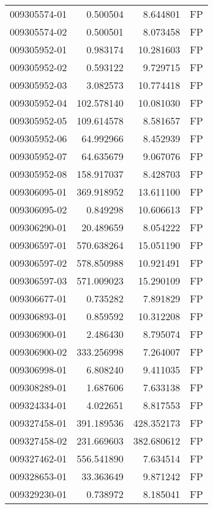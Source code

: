 \begin{tabular}{lrrl}
009305574-01 &    0.500504 &       8.644801 &   FP \\
009305574-02 &    0.500501 &       8.073458 &   FP \\
009305952-01 &    0.983174 &      10.281603 &   FP \\
009305952-02 &    0.593122 &       9.729715 &   FP \\
009305952-03 &    3.082573 &      10.774418 &   FP \\
009305952-04 &  102.578140 &      10.081030 &   FP \\
009305952-05 &  109.614578 &       8.581657 &   FP \\
009305952-06 &   64.992966 &       8.452939 &   FP \\
009305952-07 &   64.635679 &       9.067076 &   FP \\
009305952-08 &  158.917037 &       8.428703 &   FP \\
009306095-01 &  369.918952 &      13.611100 &   FP \\
009306095-02 &    0.849298 &      10.606613 &   FP \\
009306290-01 &   20.489659 &       8.054222 &   FP \\
009306597-01 &  570.638264 &      15.051190 &   FP \\
009306597-02 &  578.850988 &      10.921491 &   FP \\
009306597-03 &  571.009023 &      15.290109 &   FP \\
009306677-01 &    0.735282 &       7.891829 &   FP \\
009306893-01 &    0.859592 &      10.312208 &   FP \\
009306900-01 &    2.486430 &       8.795074 &   FP \\
009306900-02 &  333.256998 &       7.264007 &   FP \\
009306998-01 &    6.808240 &       9.411035 &   FP \\
009308289-01 &    1.687606 &       7.633138 &   FP \\
009324334-01 &    4.022651 &       8.817553 &   FP \\
009327458-01 &  391.189536 &     428.352173 &   FP \\
009327458-02 &  231.669603 &     382.680612 &   FP \\
009327462-01 &  556.541890 &       7.634514 &   FP \\
009328653-01 &   33.363649 &       9.871242 &   FP \\
009329230-01 &    0.738972 &       8.185041 &   FP \\

\end{tabular}
